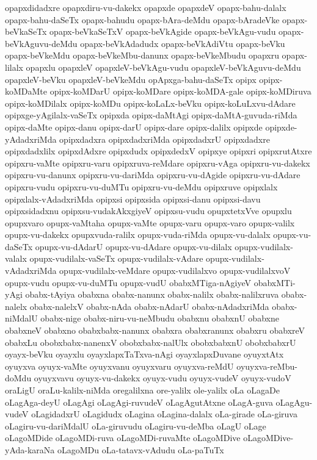 {opapxdidadxre
opapxdiru-vu-dakekx
opapxde
opapxdeV
opapx-bahu-dalalx
opapx-bahu-daSeTx
opapx-bahudu
opapx-bAra-deMdu
opapx-bAradeVke
opapx-beVkaSeTx
opapx-beVkaSeTxV
opapx-beVkAgide
opapx-beVkAgu-vudu
opapx-beVkAguvu-deMdu
opapx-beVkAdadudx
opapx-beVkAdiVtu
opapx-beVku
opapx-beVkeMdu
opapx-beVkeMbu-danunx
opapx-beVkeMbudu
opapxru
opapx-lilalx
opapxlu
opapxleV
opapxleV-beVkAgu-vudu
opapxleV-beVkAguvu-deMdu
opapxleV-beVku
opapxleV-beVkeMdu
opApxga-bahu-daSeTx
opipx
opipx-koMDaMte
opipx-koMDarU
opipx-koMDare
opipx-koMDA-gale
opipx-koMDiruva
opipx-koMDilalx
opipx-koMDu
opipx-koLaLx-beVku
opipx-koLuLxvu-dAdare
opipxge-yAgilalx-vaSeTx
opipxda
opipx-daMtAgi
opipx-daMtA-guvuda-riMda
opipx-daMte
opipx-danu
opipx-darU
opipx-dare
opipx-dalilx
opipxde
opipxde-yAdadxriMda
opipxdadxra
opipxdadxriMda
opipxdadxrU
opipxdadxre
opipxdadxlilx
opipxdAdxre
opipxdudx
opipxdedxV
opipxye
opipxri
opipxrutAtxre
opipxru-vaMte
opipxru-varu
opipxruva-reMdare
opipxru-vAga
opipxru-vu-dakekx
opipxru-vu-danunx
opipxru-vu-dariMda
opipxru-vu-dAgide
opipxru-vu-dAdare
opipxru-vudu
opipxru-vu-duMTu
opipxru-vu-deMdu
opipxruve
opipxlalx
opipxlalx-vAdadxriMda
opipxsi
opipxsida
opipxsi-danu
opipxsi-davu
opipxsidadxnu
opipxsu-vudakAkxgiyeV
opipxsu-vudu
opupxtetxVve
opupxlu
opupxvaro
opupx-vaMtaha
opupx-vaMte
opupx-varu
opupx-varo
opupx-valilx
opupx-vu-dakekx
opupxvuda-ralilx
opupx-vuda-riMda
opupx-vu-dalalx
opupx-vu-daSeTx
opupx-vu-dAdarU
opupx-vu-dAdare
opupx-vu-dilalx
opupx-vudilalx-valalx
opupx-vudilalx-vaSeTx
opupx-vudilalx-vAdare
opupx-vudilalx-vAdadxriMda
opupx-vudilalx-veMdare
opupx-vudilalxvo
opupx-vudilalxvoV
opupx-vudu
opupx-vu-duMTu
opupx-vudU
obabxMTiga-nAgiyeV
obabxMTi-yAgi
obabx-tAyiya
obabxna
obabx-nanunx
obabx-nalilx
obabx-nalilxruva
obabx-nalelx
obabx-nalelxV
obabx-nAda
obabx-nAdarU
obabx-nAdadxriMda
obabx-niMdalU
obabx-nige
obabx-niru-vu-neMbudu
obabxnu
obabxnU
obabxne
obabxneV
obabxno
obabxbabx-nanunx
obabxra
obabxranunx
obabxru
obabxreV
obabxLu
obobxbabx-nanenxV
obobxbabx-nalUlx
obobxbabxnU
obobxbabxrU
oyayx-beVku
oyayxlu
oyayxlapxTaTxva-nAgi
oyayxlapxDuvane
oyuyxtAtx
oyuyxva
oyuyx-vaMte
oyuyxvanu
oyuyxvaru
oyuyxva-reMdU
oyuyxva-reMbu-doMdu
oyuyxvavu
oyuyx-vu-dakekx
oyuyx-vudu
oyuyx-vudeV
oyuyx-vudoV
oraLigU
oraLu-kalilx-niMda
oregalilxna
ore-yalilx
ole-yalilx
oLa
oLagaDe
oLagAga-deyU
oLagAgi
oLagAgi-ruvudeV
oLagAgutAtxne
oLagA-guva
oLagAgu-vudeV
oLagidadxrU
oLagidudx
oLagina
oLagina-dalalx
oLa-girade
oLa-giruva
oLagiru-vu-dariMdalU
oLa-giruvudu
oLagiru-vu-deMba
oLagU
oLage
oLagoMDide
oLagoMDi-ruva
oLagoMDi-ruvaMte
oLagoMDive
oLagoMDive-yAda-karaNa
oLagoMDu
oLa-tatavx-vAdudu
oLa-paTuTx
}
